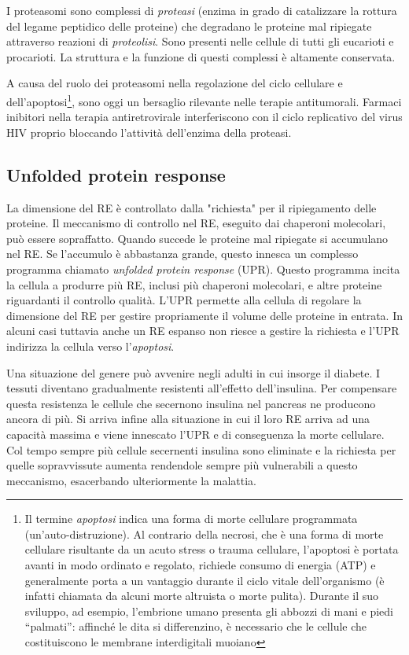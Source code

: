 {{\par I proteasomi sono complessi di \textit{proteasi} (enzima in grado di catalizzare la rottura del legame peptidico delle proteine) che degradano le proteine mal ripiegate attraverso reazioni di \textit{proteolisi}. Sono presenti nelle cellule di tutti gli eucarioti e procarioti. La struttura e la funzione di questi complessi è altamente conservata.

\par A causa del ruolo dei proteasomi nella regolazione del ciclo cellulare e dell'apoptosi\footnote{Il termine \textit{apoptosi} indica una forma di morte cellulare programmata (un'auto-distruzione). Al contrario della necrosi, che è una forma di morte cellulare risultante da un acuto stress o trauma cellulare, l'apoptosi è portata avanti in modo ordinato e regolato, richiede consumo di energia (ATP) e generalmente porta a un vantaggio durante il ciclo vitale dell'organismo (è infatti chiamata da alcuni morte altruista o morte pulita). Durante il suo sviluppo, ad esempio, l'embrione umano presenta gli abbozzi di mani e piedi “palmati”: affinché le dita si differenzino, è necessario che le cellule che costituiscono le membrane interdigitali muoiano}, sono oggi un bersaglio rilevante nelle terapie antitumorali. Farmaci inibitori nella terapia antiretrovirale interferiscono con il ciclo replicativo del virus HIV proprio bloccando l'attività dell'enzima della proteasi.

}
\subsection{Unfolded protein response}
{

La dimensione del RE è controllato dalla "richiesta" per il ripiegamento delle proteine. Il meccanismo di controllo nel RE, eseguito dai chaperoni molecolari, può essere sopraffatto. Quando succede le proteine mal ripiegate si accumulano nel RE. 
Se l'accumulo è abbastanza grande, questo innesca un complesso programma chiamato \textit{unfolded protein response} (UPR). Questo programma incita la cellula a produrre più RE, inclusi più chaperoni molecolari, e altre proteine riguardanti il controllo qualità. L'UPR permette alla cellula di regolare la dimensione del RE per gestire propriamente il volume delle proteine in entrata. In alcuni casi tuttavia anche un RE espanso non riesce a gestire la richiesta e l'UPR indirizza la cellula verso l'\textit{apoptosi}.

\par Una situazione del genere può avvenire negli adulti in cui insorge il diabete. I tessuti diventano gradualmente resistenti all'effetto dell'insulina. Per compensare questa resistenza le cellule che secernono insulina nel pancreas ne producono ancora di più. Si arriva infine alla situazione in cui il loro RE arriva ad una capacità massima e viene innescato l'UPR e di conseguenza la morte cellulare. Col tempo sempre più cellule secernenti insulina sono eliminate e la richiesta per quelle sopravvissute aumenta rendendole sempre più vulnerabili a questo meccanismo, esacerbando ulteriormente la malattia\supercite{alberts2018essential}.
}
}

